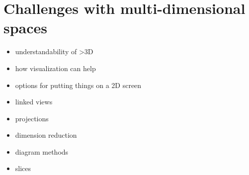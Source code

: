 \section{Challenges with multi-dimensional
spaces}\label{challenges-with-multi-dimensional-spaces}

\begin{itemize}
\tightlist
\item
  understandability of \textgreater{}3D
\item
  how visualization can help
\item
  options for putting things on a 2D screen
\item
  linked views
\item
  projections
\item
  dimension reduction
\item
  diagram methods
\item
  slices
\end{itemize}

